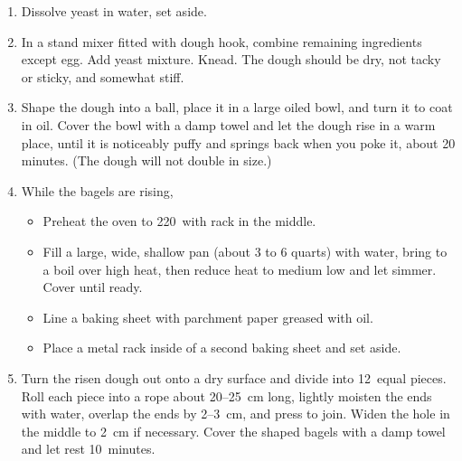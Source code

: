 
\begin{ingredients}
\end{ingredients}


\begin{recipe}
  \begin{enumerate}

  \item Dissolve yeast in water, set aside.

  \item In a stand mixer fitted with dough hook, combine remaining
    ingredients except egg.  Add yeast mixture.  Knead.  The dough
    should be dry, not tacky or sticky, and somewhat stiff.

  \item Shape the dough into a ball, place it in a large oiled bowl,
    and turn it to coat in oil. Cover the bowl with a damp towel and
    let the dough rise in a warm place, until it is noticeably puffy
    and springs back when you poke it, about 20 minutes. (The dough
    will not double in size.)

  \item While the bagels are rising,
    \begin{itemize}
      
    \item Preheat the oven to 220\C\ with rack in the middle.

    \item Fill a large, wide, shallow pan (about 3 to 6 quarts) with
      water, bring to a boil over high heat, then reduce heat to
      medium low and let simmer. Cover until ready.

    \item Line a baking sheet with parchment paper greased with
      oil.

    \item Place a metal rack inside of a second baking sheet and set
      aside.

    \end{itemize}

  \item Turn the risen dough out onto a dry surface and divide into
    12~equal pieces.  Roll each piece into a rope about 20--25~cm
    long, lightly moisten the ends with water, overlap the ends by
    2--3~cm, and press to join. Widen the hole in the middle to 2~cm
    if necessary.  Cover the shaped bagels with a damp towel and let
    rest 10~minutes.


\end{enumerate}
\end{recipe}
